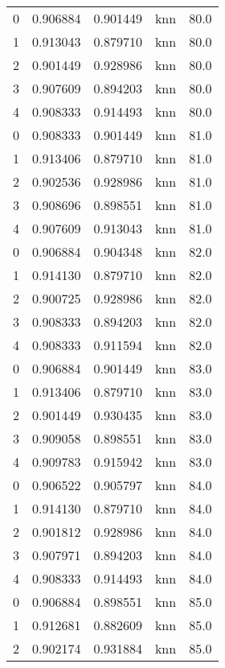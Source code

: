 \begin{tabular}{rrrlr}
     0 & 0.906884 & 0.901449 &      knn &       80.0 \\
     1 & 0.913043 & 0.879710 &      knn &       80.0 \\
     2 & 0.901449 & 0.928986 &      knn &       80.0 \\
     3 & 0.907609 & 0.894203 &      knn &       80.0 \\
     4 & 0.908333 & 0.914493 &      knn &       80.0 \\
     0 & 0.908333 & 0.901449 &      knn &       81.0 \\
     1 & 0.913406 & 0.879710 &      knn &       81.0 \\
     2 & 0.902536 & 0.928986 &      knn &       81.0 \\
     3 & 0.908696 & 0.898551 &      knn &       81.0 \\
     4 & 0.907609 & 0.913043 &      knn &       81.0 \\
     0 & 0.906884 & 0.904348 &      knn &       82.0 \\
     1 & 0.914130 & 0.879710 &      knn &       82.0 \\
     2 & 0.900725 & 0.928986 &      knn &       82.0 \\
     3 & 0.908333 & 0.894203 &      knn &       82.0 \\
     4 & 0.908333 & 0.911594 &      knn &       82.0 \\
     0 & 0.906884 & 0.901449 &      knn &       83.0 \\
     1 & 0.913406 & 0.879710 &      knn &       83.0 \\
     2 & 0.901449 & 0.930435 &      knn &       83.0 \\
     3 & 0.909058 & 0.898551 &      knn &       83.0 \\
     4 & 0.909783 & 0.915942 &      knn &       83.0 \\
     0 & 0.906522 & 0.905797 &      knn &       84.0 \\
     1 & 0.914130 & 0.879710 &      knn &       84.0 \\
     2 & 0.901812 & 0.928986 &      knn &       84.0 \\
     3 & 0.907971 & 0.894203 &      knn &       84.0 \\
     4 & 0.908333 & 0.914493 &      knn &       84.0 \\
     0 & 0.906884 & 0.898551 &      knn &       85.0 \\
     1 & 0.912681 & 0.882609 &      knn &       85.0 \\
     2 & 0.902174 & 0.931884 &      knn &       85.0 \\

\end{tabular}
